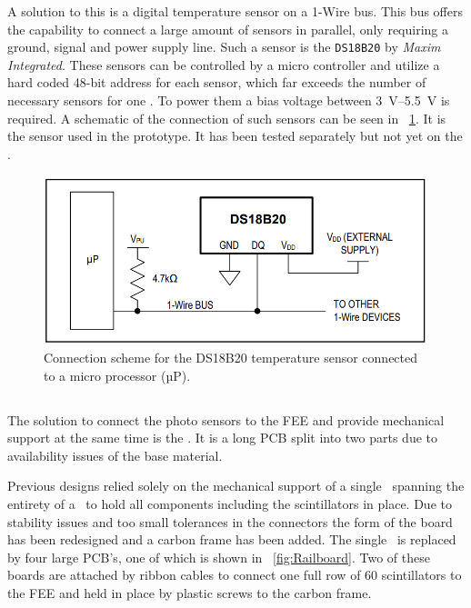 \documentclass[../BTOF_summary.tex]{subfiles}
\begin{document}
A solution to this is a digital temperature sensor on a 1-Wire bus.
This bus offers the capability to connect a large amount of sensors in parallel, only requiring a ground, signal and power supply line.
Such a sensor is the \texttt{DS18B20} by \textit{Maxim Integrated}.
These sensors can be controlled by a micro controller and utilize a hard coded 48-bit address for each sensor, which far exceeds the number of necessary sensors for one \railboard .
To power them a bias voltage between \SIrange[]{3}{5.5}{V} is required.
A schematic of the connection of such sensors can be seen in \fig ~\ref{fig:DS18B20_connection}.
It is the sensor used in the prototype.
It has been tested separately but not yet on the \railboard .

\begin{figure}[htbp]
	\centering
	\includegraphics[width=.6\textwidth]{fig/DS18B20_connection.png}
	\caption[Connection scheme for the DS18B20 temperature sensor.]{Connection scheme for the DS18B20 temperature sensor connected to a micro processor (µP).}
	\label{fig:DS18B20_connection}
\end{figure}



\subsection{\railboard}

The solution to connect the photo sensors to the FEE and provide mechanical support at the same time is the \railboard .
It is a long PCB split into two parts due to availability issues of the base material.

Previous designs relied solely on the mechanical support of a single \railboard\ spanning the entirety of a \sm\ to hold all components including the scintillators in place.
Due to stability issues and too small tolerances in the connectors the form of the board has been redesigned and a carbon frame has been added.
The single \railboard\ is replaced by four large PCB's, one of which is shown in \fig ~\ref{fig:Railboard}.
Two of these boards are attached by ribbon cables to connect one full row of 60 scintillators to the FEE and held in place by plastic screws to the carbon frame.
\end{document}
